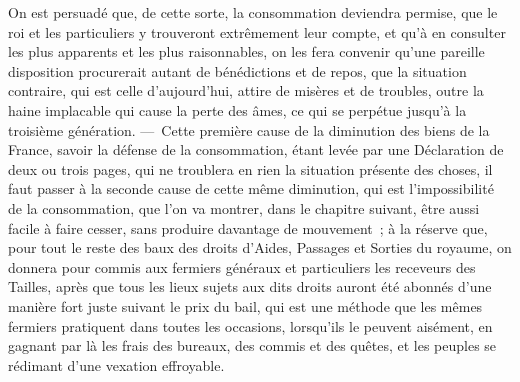\documentclass[french,twoside]{book} %
\begin{document}
On est persuadé que, de cette sorte, la consommation deviendra permise, que le roi et les particuliers y trouveront extrêmement leur compte, et qu’à en consulter les plus apparents et les plus raisonnables, on les fera convenir qu’une pareille disposition procurerait autant de bénédictions et de repos, que la situation contraire, qui est celle d’aujourd’hui, attire de misères et de troubles, outre la haine implacable qui cause la perte des âmes, ce qui se perpétue jusqu’à la troisième génération. — Cette première cause de la diminution des biens de la France, savoir la défense de la consommation, étant levée par une Déclaration de deux ou trois pages, qui ne troublera en rien la situation présente des choses, il faut passer à la seconde cause de cette même diminution, qui est l’impossibilité de la consommation, que l’on va montrer, dans le chapitre suivant, être aussi facile à faire cesser, sans produire davantage de mouvement ; à la réserve que, pour tout le reste des baux des droits d’Aides, Passages et Sorties du royaume, on donnera pour commis aux fermiers généraux et particuliers les receveurs des Tailles, après que tous les lieux sujets aux dits droits auront été abonnés d’une manière fort juste suivant le prix du bail, qui est une méthode que les mêmes fermiers pratiquent dans toutes les occasions, lorsqu’ils le peuvent aisément, en gagnant par là les frais des bureaux, des commis et des quêtes, et les peuples se rédimant d’une vexation effroyable.
\end{document}
